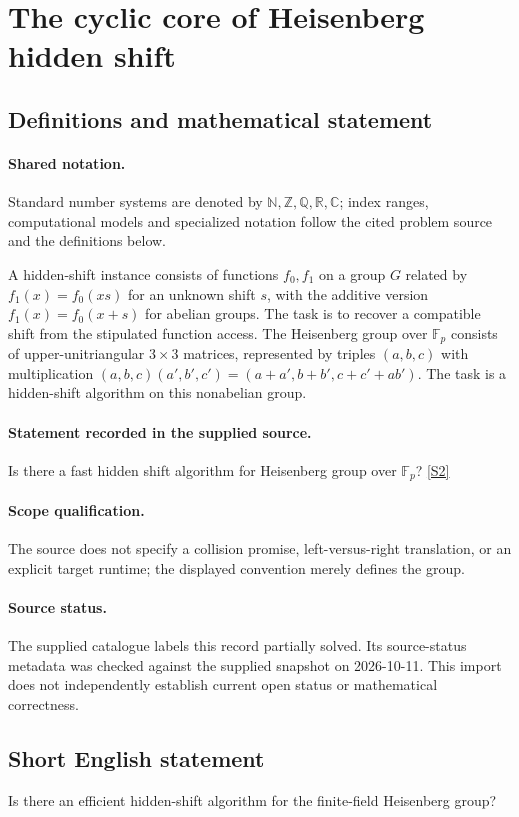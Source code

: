 \documentclass[11pt]{article}
\newcommand{\sref}[2]{\hyperlink{source:#1:#2}{[S#2]}}
\begin{document}
\section{The cyclic core of Heisenberg hidden shift}\label{statement}

\subsection{Definitions and mathematical statement}

\paragraph{Shared notation.}Standard number systems are denoted by $\mathbb N,\mathbb Z,\mathbb Q,\mathbb R,\mathbb C$; index ranges, computational models and specialized notation follow the cited problem source and the definitions below.


A hidden-shift instance consists of functions $f_0,f_1$ on a group $G$ related by $f_1(x)=f_0(xs)$ for an unknown shift $s$, with the additive version $f_1(x)=f_0(x+s)$ for abelian groups. The task is to recover a compatible shift from the stipulated function access. The Heisenberg group over $\mathbb F_p$ consists of upper-unitriangular $3\times3$ matrices, represented by triples $(a,b,c)$ with multiplication $(a,b,c)(a',b',c')=(a+a',b+b',c+c'+ab')$. The task is a hidden-shift algorithm on this nonabelian group.
\paragraph{Statement recorded in the supplied source.}
Is there a fast hidden shift algorithm for Heisenberg group over $\mathbb F_p$? \sref{statement}{2}
\paragraph{Scope qualification.}
The source does not specify a collision promise, left-versus-right translation, or an explicit target runtime; the displayed convention merely defines the group.
\paragraph{Source status.}
The supplied catalogue labels this record partially solved. Its source-status metadata was checked against the supplied snapshot on 2026-10-11. This import does not independently establish current open status or mathematical correctness.
\subsection{Short English statement}
Is there an efficient hidden-shift algorithm for the finite-field Heisenberg group?
\end{document}
